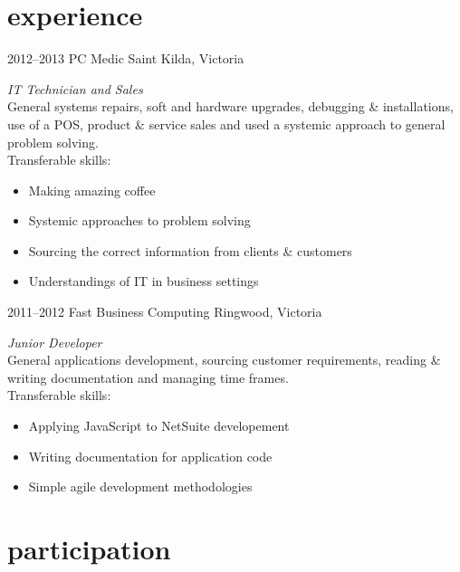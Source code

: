 \documentclass[]{friggeri-cv} %
\begin{document}
\section{experience}

\begin{entrylist}
\entry
{2012--2013}
{PC Medic}
{Saint Kilda, Victoria}
{\emph{IT Technician and Sales} \\
General systems repairs, soft and hardware upgrades, debugging \& installations, use of a POS, product \& service sales and used a systemic approach to general problem solving. \\
Transferable skills:
\begin{itemize}
    \item Making amazing coffee
    \item Systemic approaches to problem solving
    \item Sourcing the correct information from clients \& customers
    \item Understandings of IT in business settings
\end{itemize}}
\entry
{2011--2012}
{Fast Business Computing}
{Ringwood, Victoria}
{\emph{Junior Developer} \\
General applications development, sourcing customer requirements, reading \& writing documentation and managing time frames. \\
Transferable skills:
\begin{itemize}
    \item Applying JavaScript to NetSuite developement
    \item Writing documentation for application code
    \item Simple agile development methodologies
\end{itemize}
}
\end{entrylist}


\section{participation}
\end{document}
